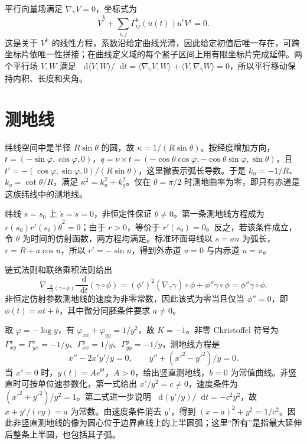 \documentclass[UTF8,12pt,a4paper,fontset=fandol]{ctexbook}
\newcommand{\dd}{\mathop{}\!\mathrm d}
\newcommand{\ip}[2]{\langle #1,#2\rangle}
\begin{document}
\begin{solve}
平行向量场满足 $\nabla_{\dot\gamma}V=0$，坐标式为
\[
 \dot V^k+\sum_{i,j}\Gamma^k_{ij}(u(t))\dot u^iV^j=0.
\]
这是关于 $V^k$ 的线性方程，系数沿给定曲线光滑，因此给定初值后唯一存在，可跨坐标片依唯一性拼接；在曲线定义域的每个紧子区间上用有限坐标片完成延伸。两个平行场 $V,W$ 满足 $\dd\ip VW/\dd t=\ip{\nabla_{\dot\gamma}V}W+\ip V{\nabla_{\dot\gamma}W}=0$，所以平行移动保持内积、长度和夹角。
\end{solve}

\section{测地线}
\begin{solve}
纬线空间中是半径 $R\sin\theta$ 的圆，故 $\kappa=1/(R\sin\theta)$。按经度增加方向，$t=(-\sin\varphi,\cos\varphi,0)$，$q=\nu\times t=(-\cos\theta\cos\varphi,-\cos\theta\sin\varphi,\sin\theta)$，且 $t'=-(\cos\varphi,\sin\varphi,0)/(R\sin\theta)$，这里撇表示弧长导数。于是 $k_n=-1/R$、$k_g=\cot\theta/R$，满足 $\kappa^2=k_n^2+k_g^2$。仅在 $\theta=\pi/2$ 时测地曲率为零，即只有赤道是这族纬线中的测地线。
\end{solve}

\begin{solve}
纬线 $s=s_0$ 上 $\dot s=\ddot s=0$，非恒定性保证 $\dot\theta\ne0$。第一条测地线方程成为 $r(s_0)r'(s_0)\dot\theta^2=0$；由于 $r>0$，等价于 $r'(s_0)=0$。反之，若该条件成立，令 $\theta$ 为时间的仿射函数，两方程均满足。标准环面母线以 $s=au$ 为弧长，$r=R+a\cos u$，所以 $r'= -\sin u$，得到外赤道 $u=0$ 与内赤道 $u=\pi$。
\end{solve}

\begin{solve}
链式法则和联络乘积法则给出
\[
 \nabla_{\frac{\dd}{\dd t}(\gamma\circ\phi)}
       \frac{\dd}{\dd t}(\gamma\circ\phi)
 =(\phi')^2(\nabla_{\dot\gamma}\dot\gamma)\circ\phi
 +\phi''\dot\gamma\circ\phi
 =\phi''\dot\gamma\circ\phi.
\]
非恒定仿射参数测地线的速度为非零常数，因此该式为零当且仅当 $\phi''=0$，即 $\phi(t)=at+b$，其中微分同胚条件要求 $a\ne0$。
\end{solve}

\begin{solve}
取 $\varphi=-\log y$，有 $\varphi_{xx}+\varphi_{yy}=1/y^2$，故 $K=-1$。非零 Christoffel 符号为 $\Gamma^x_{xy}=\Gamma^x_{yx}=-1/y$、$\Gamma^y_{xx}=1/y$、$\Gamma^y_{yy}=-1/y$，测地线方程是
\[
 x''-2x'y'/y=0,\qquad y''+(x'^2-y'^2)/y=0.
\]
当 $x'=0$ 时，$y(t)=Ae^{bt}$，$A>0$，给出竖直测地线，$b=0$ 为常值曲线。非竖直时可按单位速参数化，第一式给出 $x'/y^2=c\ne0$，速度条件为 $(x'^2+y'^2)/y^2=1$。第二式进一步说明 $\dd(y'/y)/\dd t=-c^2y^2$，故 $x+y'/(cy)=a$ 为常数。由速度条件消去 $y'$，得到 $(x-a)^2+y^2=1/c^2$。因此非竖直测地线的像为圆心位于边界直线上的上半圆弧；这里“所有”是指最大延伸后整条上半圆，也包括其子弧。
\end{solve}
\end{document}
